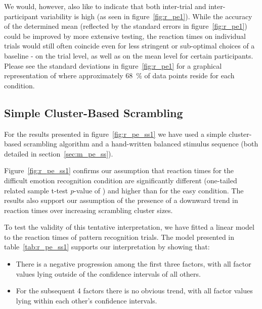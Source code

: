 	We would, however, also like to indicate that both inter-trial and inter-participant variability is high (as seen in figure~\ref{fig:r_pe1}).
	While the accuracy of the determined mean (reflected by the standard errors in figure~\ref{fig:r_pe1}) could be improved by more extensive testing,
	the reaction times on individual trials would still often coincide even for less stringent or sub-optimal choices of a baseline - 
	on the trial level, as well as on the mean level for certain participants.
	Please see the standard deviations in figure~\ref{fig:r_pe1} for a graphical representation of where approximately \SI{68}{\percent} of data points reside for each condition.
    
	\subsection{Simple Cluster-Based Scrambling}\label{sec:r_pe_ss}
	    For the results presented in figure~\ref{fig:r_pe_ss1} we have used a simple cluster-based scrambling algorithm and a hand-written balanced stimulus sequence 
	    (both detailed in section~\ref{sec:m_pe_ss}).
	    
	    Figure~\ref{fig:r_pe_ss1} confirms our assumption that reaction times for the difficult emotion recognition condition are significantly different (one-tailed related sample t-test \textit{p}-value of 
	    ) and higher than for the easy condition.
	    The results also support our assumption of the presence of a downward trend in reaction times over increasing scrambling cluster sizes.
	    
	    To test the validity of this tentative interpretation, we have fitted a linear model to the reaction times of pattern recognition trials.
	    The model presented in table~\ref{tab:r_pe_ss1} supports our interpretation by showing that:
	    \begin{itemize}
		\item There is a negative progression among the first three factors, with all factor values lying outside of the confidence intervals of all others.
		\item For the subsequent 4 factors there is no obvious trend, with all factor values lying within each other's confidence intervals. 
	    \end{itemize}

